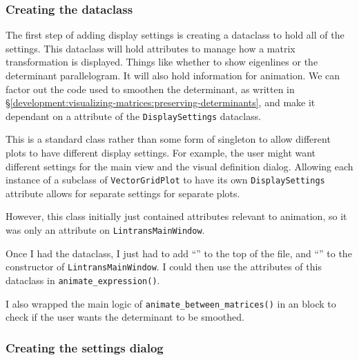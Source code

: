 \documentclass[../development.tex]{subfiles}
\begin{document}
\subsubsection{Creating the dataclass\label{development:adding-display-settings:creating-the-dataclass}}

The first step of adding display settings is creating a dataclass to hold all of the settings. This dataclass will hold attributes to manage how a matrix transformation is displayed. Things like whether to show eigenlines or the determinant parallelogram. It will also hold information for animation. We can factor out the code used to smoothen the determinant, as written in \S\ref{development:visualizing-matrices:preserving-determinants}, and make it dependant on a  attribute of the \texttt{DisplaySettings} dataclass.

This is a standard class rather than some form of singleton to allow different plots to have different display settings. For example, the user might want different settings for the main view and the visual definition dialog. Allowing each instance of a subclass of \texttt{VectorGridPlot} to have its own \texttt{DisplaySettings} attribute allows for separate settings for separate plots.

However, this class initially just contained attributes relevant to animation, so it was only an attribute on \texttt{LintransMainWindow}.


Once I had the dataclass, I just had to add \enquote{} to the top of the file, and \enquote{} to the constructor of \texttt{LintransMainWindow}. I could then use the attributes of this dataclass in \texttt{animate\_expression()}.


I also wrapped the main logic of \texttt{animate\_between\_matrices()} in an  block to check if the user wants the determinant to be smoothed.


\subsubsection{Creating the settings dialog\label{development:adding-display-settings:creating-the-settings-dialog}}
\end{document}
